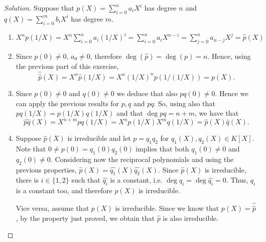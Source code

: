 \documentclass[a4paper,10pt,reqno]{amsart}
\newenvironment{sol}
  {\renewcommand\qedsymbol{$\blacksquare$}\begin{proof}[Solution]}
  {\end{proof}}
\begin{document}
\begin{sol}
Suppose that $p(X)=\sum_{i=0}^n a_iX^i$ has degree $n$ and $q(X)=\sum_{i=0}^m b_iX^i$ has degree $m$.
    \begin{enumerate}[label=(\roman*)]
    \item 
    $X^np(1/X)=X^n\sum_{i=0}^n a_i(1/X)^i=\sum_{i=0}^n a_iX^{n-i}=\sum_{j=0}^n a_{n-j}X^j=\widehat{p}(X)$
    \item Since $p(0)\neq 0$, $a_0\neq 0$, therefore $\deg(\widehat{p})=\deg(p)=n$. Hence, using the previous part of this exercise,
    \[
    \widehat{\widehat{p}}(X)=X^n\widehat{p}(1/X)=X^n(1/X)^np(1/(1/X))=p(X).
    \]    
    \item Since $p(0)\neq 0$ and $q(0)\neq 0$ we deduce that also $pq(0)\neq 0$.
    Hence we can apply the previous results for $p,q$ and $pq$. 
    So, using also that $pq(1/X)=p(1/X)q(1/X)$ and that $\deg{pq}=n+m$, we have that
    \[
    \widehat{pq}(X)=X^{n+m}pq(1/X)=X^np(1/X)X^mq(1/X)=\widehat{p}(X)\widehat{q}(X).
    \]
    \item Suppose $\widehat{p}(X)$ is irreducible and let $p=q_1q_2$ for
    $q_1(X),q_2(X)\in K[X]$.
    Note that $0\neq p(0)=q_1(0)q_2(0)$ implies that both $q_1(0)\neq 0$ and $q_2(0)\neq 0$.
    Considering now the reciprocal polynomials and using the previous properties,
    $\widehat{p}(X)=\widehat{q_1}(X)\widehat{q_2}(X)$.
    Since $\widehat{p}(X)$ is irreducible, there is $i\in\{1,2\}$ such that $\widehat{q_i}$ 
    is a constant, i.e. $\deg{q_i}=\deg{\widehat{q_i}}=0$.
    Thus, $q_i$ is a constant too, and therefore $p(X)$ is irreducible.

    Vice versa, assume that $p(X)$ is irreducible. Since we know that $p(X)=\widehat{\widehat{p}}$, by the property just proved, we obtain that $\widehat{p}$ 
    is also irreducible.\qedhere
    \end{enumerate}
\end{sol}
\end{document}
